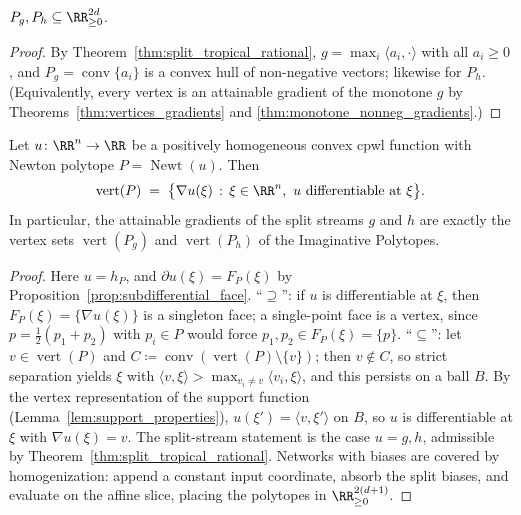 \begin{corollary}\label{cor:polytopes_nonneg}
$P_g, P_h \subseteq \RR^{2d}_{\ge 0}$.
\hfill{}
\end{corollary}

\begin{proof}
By Theorem~\ref{thm:split_tropical_rational}, $g = \max_i \langle a_i, \cdot \rangle$ with all $a_i \ge 0$, and $P_g = \operatorname{conv}\{a_i\}$ is a convex hull of non-negative vectors; likewise for $P_h$. (Equivalently, every vertex is an attainable gradient of the monotone $g$ by Theorems~\ref{thm:vertices_gradients} and \ref{thm:monotone_nonneg_gradients}.)
\end{proof}

\begin{theoremenv}\label{thm:vertices_gradients}
Let $u \colon \RR^n \to \RR$ be a positively homogeneous convex \ac{cpwl} function with Newton polytope $P = \operatorname{Newt}(u)$. Then
\begin{equation*}
    \operatorname{vert}(P)
    \;=\;
    \bigl\{ \nabla u(\xi) \, : \, \xi \in \RR^n, \ u \text{ differentiable at } \xi \bigr\}.
\end{equation*}
In particular, the attainable gradients of the split streams $g$ and $h$ are exactly the vertex sets $\operatorname{vert}(P_g)$ and $\operatorname{vert}(P_h)$ of the Imaginative Polytopes.
\hfill{}
\end{theoremenv}

\begin{proof}
Here $u = h_P$, and $\partial u(\xi) = F_P(\xi)$ by Proposition~\ref{prop:subdifferential_face}. ``$\supseteq$'': if $u$ is differentiable at $\xi$, then $F_P(\xi) = \{\nabla u(\xi)\}$ is a singleton face; a single-point face is a vertex, since $p = \tfrac12(p_1 + p_2)$ with $p_i \in P$ would force $p_1, p_2 \in F_P(\xi) = \{p\}$. ``$\subseteq$'': let $v \in \operatorname{vert}(P)$ and $C \coloneqq \operatorname{conv}(\operatorname{vert}(P) \setminus \{v\})$; then $v \notin C$, so strict separation yields $\xi$ with $\langle v, \xi \rangle > \max_{v_i \ne v} \langle v_i, \xi \rangle$, and this persists on a ball $B$. By the vertex representation of the support function (Lemma~\ref{lem:support_properties}), $u(\xi') = \langle v, \xi' \rangle$ on $B$, so $u$ is differentiable at $\xi$ with $\nabla u(\xi) = v$. The split-stream statement is the case $u = g, h$, admissible by Theorem~\ref{thm:split_tropical_rational}. Networks with biases are covered by homogenization: append a constant input coordinate, absorb the split biases, and evaluate on the affine slice, placing the polytopes in $\RR^{2(d+1)}_{\ge 0}$.
\end{proof}

